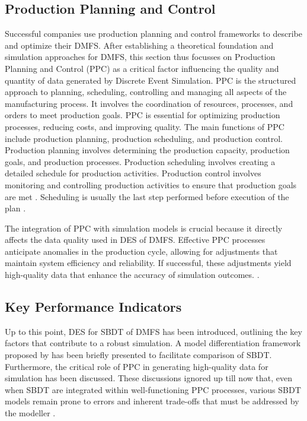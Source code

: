 \subsection{Production Planning and Control}
\label{sec:ppc}
Successful companies use production planning and control frameworks to describe and optimize their DMFS. After establishing a theoretical foundation and simulation approaches for DMFS, this section thus focusses on Production Planning and Control (PPC) as a critical factor influencing the quality and quantity of data generated by Discrete Event Simulation.
PPC is the structured approach to planning, scheduling, controlling and managing all aspects of the manufacturing process. It involves the coordination of resources, processes, and orders to meet production goals. PPC is essential for optimizing production processes, reducing costs, and improving quality. The main functions of PPC include production planning, production scheduling, and production control. Production planning involves determining the production capacity, production goals, and production processes. Production scheduling involves creating a detailed schedule for production activities. Production control involves monitoring and controlling production activities to ensure that production goals are met \autocite{kiran2019production}. Scheduling is usually the last step performed before execution of the plan \autocite{pinedo2012design}.

The integration of PPC with simulation models is crucial because it directly affects the data quality used in DES of DMFS. Effective PPC processes anticipate anomalies in the production cycle, allowing for adjustments that maintain system efficiency and reliability. If successful, these adjustments yield high-quality data that enhance the accuracy of simulation outcomes. \autocite{kiran2019production}.


\subsection{Key Performance Indicators}
\label{sec:relevant-kpis}
Up to this point, DES for SBDT of DMFS has been introduced, outlining the key factors that contribute to a robust simulation. A model differentiation framework proposed by \citeauthor*{schwede2024learning} has been briefly presented to facilitate comparison of SBDT. Furthermore, the critical role of PPC in generating high-quality data for simulation has been discussed. These discussions ignored up till now that, even when SBDT are integrated within well-functioning PPC processes, various SBDT models remain prone to errors and inherent trade-offs that must be addressed by the modeller \autocite{Tao2018ijamt}.

